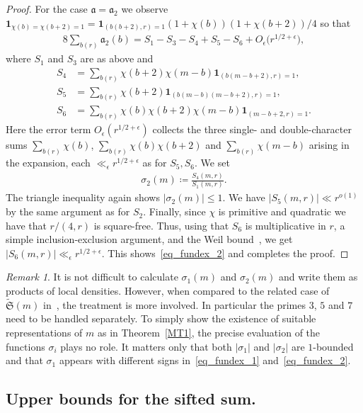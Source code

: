 \documentclass[12pt]{amsart}
\theoremstyle{definition}
\theoremstyle{remark}
\newtheorem{remark}[theorem]{Remark}
\numberwithin{equation}{section}
\newcommand{\1}{\mathbf{1}}
\begin{document}
\begin{proof}
    For the case $\mathfrak{a}=\mathfrak{a}_2$ we observe $\1_{\chi(b)=\chi(b+2)=1}=\1_{(b(b+2),r)=1}(1+\chi(b))(1+\chi(b+2))/4$ so that
	\begin{align*}
		8\sum_{b(r)}\mathfrak{a}_2(b)=S_1-S_3-S_4+S_5-S_6{}+O_\epsilon\bigl(r^{1/2+\epsilon}\bigr),
	\end{align*}
	where $S_1$ and $S_3$ are as above and
	\begin{align*}
		S_4&= \sum_{b(r)}\chi(b+2)\chi(m-b)\1_{(b(m-b+2),r)=1},\\
		S_5&=\sum_{b(r)}\chi(b+2)\1_{(b(m-b)(m-b+2),r)=1},\\
		S_6&=\sum_{b(r)}\chi(b)\chi(b+2)\chi(m-b)\1_{(m-b+2,r)=1}.
	\end{align*}
	Here the error term $O_\epsilon(r^{1/2+\epsilon})$ collects the three single- and double-character sums $\sum_{b(r)}\chi(b)$, $\sum_{b(r)}\chi(b)\chi(b+2)$ and $\sum_{b(r)}\chi(m-b)$ arising in the expansion, each $\ll_\epsilon r^{1/2+\epsilon}$ as for $S_5,S_6$.
	We set
	\begin{align*}
		\sigma_2(m)\coloneqq\frac{S_4(m,r)}{S_1(m,r)}.
	\end{align*}
	The triangle inequality again shows $|\sigma_2(m)|\leq 1$. We have $|S_5(m,r)|\ll r^{o(1)}$ by the same argument as for $S_2$. Finally, since  $\chi$ is primitive and quadratic we have that $r/(4,r)$ is square-free. Thus, using that $S_6$ is multiplicative in $r$, a simple inclusion-exclusion argument, and the Weil bound~\cite[Corollary 11.24]{iw-kow}, we get $|S_6(m,r)|\ll_{\epsilon} r^{1/2+\epsilon}$. This shows~\eqref{eq_fundex_2} and completes the proof.
\end{proof}
	
\begin{remark}
	It is not difficult to calculate $\sigma_1(m)$ and $\sigma_2(m)$ and write them as products of local densities. However, when compared to the related case of $\widetilde{\mathfrak{S}}(m)$ in~\cite{mv}, the treatment is more involved. In particular the primes $3$, $5$ and $7$ need to be handled separately. To simply show the existence of suitable representations of $m$ as in Theorem~\ref{MT1}, the precise evaluation of the functions $\sigma_i$ plays no role. It matters only that both $|\sigma_1|$ and $|\sigma_2|$ are $1$-bounded and that $\sigma_1$ appears with different signs in~\eqref{eq_fundex_1} and~\eqref{eq_fundex_2}.
\end{remark}
	
\subsection{Upper bounds for the sifted sum.}\label{subsec:6.3}
\end{document}
